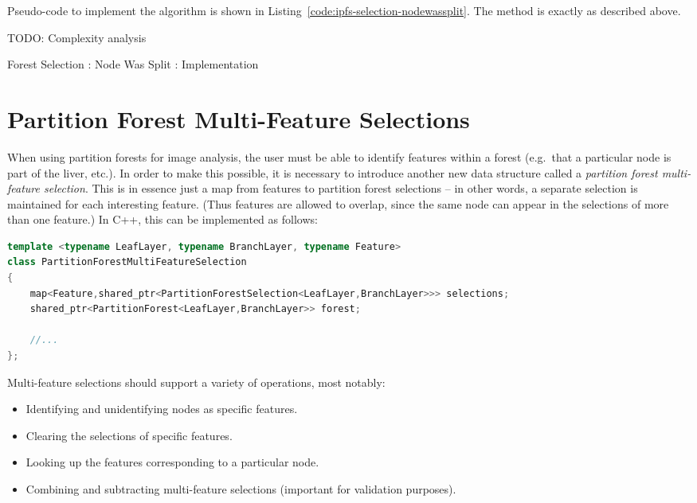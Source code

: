Pseudo-code to implement the algorithm is shown in Listing~\ref{code:ipfs-selection-nodewassplit}. The method is exactly as described above.

TODO: Complexity analysis

\begin{stulisting}[p]
\caption{Forest Selection : Node Was Split : Implementation}
\label{code:ipfs-selection-nodewassplit}

\end{stulisting}

\afterpage{\clearpage}
\newpage

\section{Partition Forest Multi-Feature Selections}

When using partition forests for image analysis, the user must be able to identify features within a forest (e.g.~that a particular node is part of the liver, etc.). In order to make this possible, it is necessary to introduce another new data structure called a \emph{partition forest multi-feature selection}. This is in essence just a map from features to partition forest selections -- in other words, a separate selection is maintained for each interesting feature. (Thus features are allowed to overlap, since the same node can appear in the selections of more than one feature.) In C++, this can be implemented as follows:

\begin{lstlisting}[style=Default,language=C++]
template <typename LeafLayer, typename BranchLayer, typename Feature>
class PartitionForestMultiFeatureSelection
{
	map<Feature,shared_ptr<PartitionForestSelection<LeafLayer,BranchLayer>>> selections;
	shared_ptr<PartitionForest<LeafLayer,BranchLayer>> forest;

	//...
};
\end{lstlisting}

\noindent Multi-feature selections should support a variety of operations, most notably:

\begin{itemize}
\item Identifying and unidentifying nodes as specific features.
\item Clearing the selections of specific features.
\item Looking up the features corresponding to a particular node.
\item Combining and subtracting multi-feature selections (important for validation purposes).
\end{itemize}

